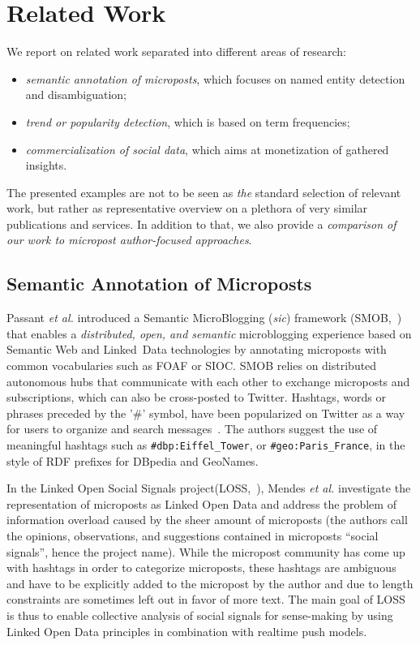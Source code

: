 \documentclass{iosart2c}
\begin{document}
\section{Related Work} \label{sec:relatedwork}
We report on related work separated into different areas of research:
\begin{itemize}
\item \emph{semantic annotation of microposts}, which focuses on named entity detection and disambiguation;
\item \emph{trend or popularity detection}, which is based on term frequencies;
\item \emph{commercialization of social data}, which aims at monetization of gathered insights.
\end{itemize}
The presented examples are not to be seen as \emph{the} standard selection of relevant work, but rather as representative overview on a plethora of very similar publications and services.
In addition to that, we also provide a \emph{comparison of our work to micropost author-focused approaches}.

\subsection{Semantic Annotation of Microposts}
Passant \textit{et al.} introduced a Semantic MicroBlogging (\textit{sic}) framework (SMOB,~\cite{Passant2008}) that enables a \textit{distributed, open, and semantic} microblogging experience based on Semantic Web and Linked~Data technologies by annotating microposts with common vocabularies such as FOAF or SIOC.
SMOB relies on distributed autonomous hubs that communicate with each other to exchange microposts and subscriptions, which can also be cross-posted to Twitter.
Hashtags, words or phrases preceded by the '\#' symbol, have been popularized on Twitter as a way for users to organize and search messages~\cite{hashtag}.
The authors suggest the use of meaningful hashtags such as \texttt{\#dbp:Eiffel\_Tower}, or \texttt{\#geo:Paris\_France}, in the style of RDF prefixes for DBpedia and GeoNames.

In the Linked Open Social Signals project\linebreak (LOSS,~\cite{Mendes:LOSS}), Mendes \textit{et al.} investigate the representation of microposts as Linked Open Data and address the problem of information overload caused by the sheer amount of microposts (the authors call the opinions, observations, and suggestions contained in microposts ``social signals'', hence the project name).
While the micropost community has come up with hashtags in order to categorize microposts, these hashtags are ambiguous and have to be explicitly added to the micropost by the author and due to length constraints are sometimes left out in favor of more text.
The main goal of LOSS is thus to enable collective analysis of social signals for sense-making by using Linked Open Data principles in combination with realtime push models.
\end{document}
